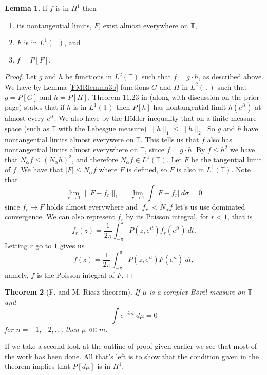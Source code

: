 \documentclass[a4paper,12pt,twoside,BCOR=10mm]{scrbook}
\newtheorem{theorem}{Theorem}[section]
\theoremstyle{definition}
\theoremstyle{definition}
\newtheorem{lemma}[theorem]{Lemma}
\theoremstyle{definition}
\begin{document}
\begin{lemma}
\label{FMRlemma2}
If $f$ is in $H^1$ then
\begin{enumerate}
\item \label{p1}
its nontangential limits, $F$, exist almost everywhere on $\mathbb{T}$,
\item \label{p2}
$F$ is in $L^1(\mathbb{T})$, and
\item \label{p3}
$f = P[F]$.
\end{enumerate}
\end{lemma}
\begin{proof}
Let $g$ and $h$ be functions in $L^2(\mathbb{T})$ such that $f = g \cdot h$, as described above.
We have by Lemma \ref{FMRlemma3b} functions $G$ and $H$ in $L^2(\mathbb{T})$ such that $g = P[G]$ and $h = P[H]$.
Theorem $11.23$ in \citep{rudin2} (along with discussion on the prior page) states that if $h$ is in $L^1(\mathbb{T})$ then $P[h]$ has nontangential limit $h(e^{it})$ at almost every $e^{it}$.
We also have by the Hölder inequality that on a finite measure space (such as $\mathbb{T}$ with the Lebesgue measure) $\|h\|_1 \leq \|h\|_2$.
So $g$ and $h$ have nontangential limits almost everywere on $\mathbb{T}$.
This tells us that $f$ also has nontangential limits almost everywhere on $\mathbb{T}$, since $f = g \cdot h$.
By $f \leq h^2$ we have that $N_{\alpha}f \leq (N_{\alpha}h)^2$, and therefore $N_{\alpha}f \in L^1(\mathbb{T})$.
Let $F$ be the tangential limit of $f$.
We have that $|F| \leq N_{\alpha}f$ where $F$ is defined, so $F$ is also in $L^1(\mathbb{T})$.
Note that
\[
	\lim_{r \rightarrow 1} \|F - f_r\|_1 = \lim_{r \rightarrow 1} \int |F - f_r|\ d\sigma = 0
\]
since $f_r \rightarrow F$ holds almost everywhere and $|f_r| < N_{\alpha}f$ let's us use dominated convergence.
We can also represent $f_r$ by its Poisson integral, for $r < 1$, that is
\[
	f_r(z) = \frac{1}{2\pi} \int_{-\pi}^{\pi} P(z, e^{it})f_r(e^{it})\ dt.
\]
Letting $r$ go to $1$ gives us
\[
	f(z) = \frac{1}{2\pi} \int_{-\pi}^{\pi} P(z, e^{it})F(e^{it})\ dt,
\]
namely, $f$ is the Poisson integral of $F$.
\end{proof}
\begin{theorem}[F. and M. Riesz theorem]
If $\mu$ is a complex Borel measure on $\mathbb{T}$ and
\[
	\int e^{-int}\ d\mu = 0
\]
for $n = -1, -2, ...$, then $\mu \lll m$.
\end{theorem}
If we take a second look at the outline of proof given earlier we see that most of the work has been done.
All that's left is to show that the condition given in the theorem implies that $P[d\mu]$ is in $H^1$.
\end{document}

